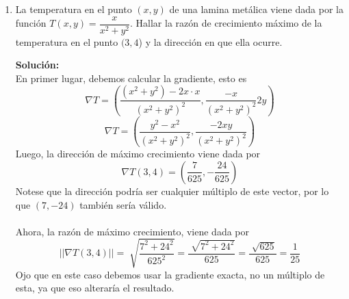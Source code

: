 \documentclass[12pt]{article}
\newenvironment{solucion}
{\begin{mdframed}[backgroundcolor=black!10]
		{\bf Solución:}\\
	}
	{
	\end{mdframed}
}
\newenvironment{preguntas}
{\begin{enumerate}\itemsep12pt
	}
	{
	\end{enumerate}
}
\begin{document}
\begin{preguntas}
\begin{solucion}
$$D_{(5,12)}(1,1) = \begin{pmatrix}f_x(1,1) \\ f_y(1,1)\end{pmatrix} \cdot \begin{pmatrix}\frac{5}{13} \\ \frac{12}{13}\end{pmatrix} = 1$$
$$\dfrac{5}{13}f_x(1,1) + \dfrac{12}{13}f_y(1,1) = 1$$
$$5f_x(1,1) + 12f_y(1,1) = 13$$
Resolviendo este sistema de ecuaciones, obtenemos que
$$f_x(1,1) = 7 \qquad f_y(1,1) = -4$$
\begin{enumerate}[a)]
\item Para obtener el plano tangente, lo podemos hacer con la formula, esto es
$$z - f(1,1) = f_x(1,1)(x-1) + f_y(1,1)(y-1)$$
$$z - f(1,1) = 7(x-1) - 4(y-1)$$
$$7x - 4y - z = 3 - f(1,1)$$
\item $D_{(1,1)}(1,1) = \begin{pmatrix}f_x(1,1) \\ f_y(1,1)\end{pmatrix} \cdot \begin{pmatrix}-\frac{1}{\sqrt[]{2}} \\ -\frac{1}{\sqrt[]{2}}\end{pmatrix}
= \begin{pmatrix}7 \\ -4\end{pmatrix} \cdot \begin{pmatrix}-\frac{1}{\sqrt[]{2}} \\ -\frac{1}{\sqrt[]{2}}\end{pmatrix}
= -\frac{3}{\sqrt[]{2}}$
\end{enumerate}
\end{solucion}
\item La temperatura en el punto $(x,y)$ de una lamina metálica viene dada por la función $T(x,y) = \dfrac{x}{x^2+y^2}$. Hallar la razón de crecimiento máximo de la temperatura en el punto $(3,4$) y la dirección en que ella ocurre.
\begin{solucion}
En primer lugar, debemos calcular la gradiente, esto es
$$\nabla T = \left( 
\dfrac{(x^2+y^2) - 2x\cdot x}{(x^2+y^2)^2}, 
\dfrac{-x}{(x^2+y^2)^2}2y
\right)$$
$$\nabla T = \left( 
\dfrac{y^2 - x^2}{(x^2+y^2)^2}, 
\dfrac{-2xy}{(x^2+y^2)^2}
\right)$$
Luego, la dirección de máximo crecimiento viene dada por
$$\nabla T(3,4) = \left( 
\dfrac{7}{625}, 
-\dfrac{24}{625}
\right)$$
Notese que la dirección podría ser cualquier múltiplo de este vector, por lo que $(7,-24)$ también sería válido.\\
\\
Ahora, la razón de máximo crecimiento, viene dada por
$$||\nabla T(3,4)|| 
= \sqrt[]{\dfrac{7^2 + 24^2}{625^2}}
= \dfrac{\sqrt[]{7^2 + 24^2}}{625}
= \dfrac{\sqrt[]{625}}{625}
= \dfrac{1}{25}$$
Ojo que en este caso debemos usar la gradiente exacta, no un múltiplo de esta, ya que eso alteraría el resultado.\\


\end{solucion}
\end{preguntas}
\end{document}
